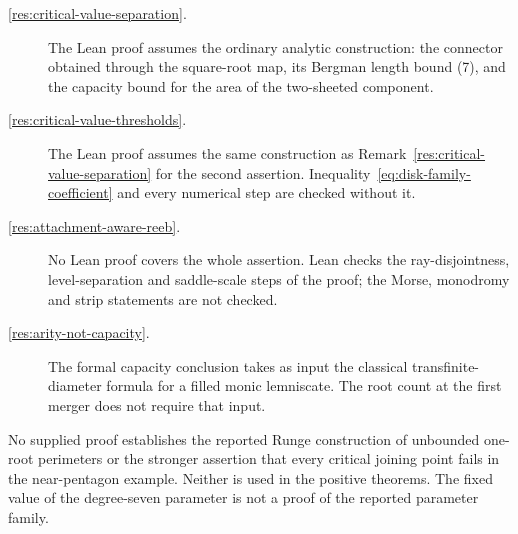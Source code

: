 \documentclass[11pt]{article}
\begin{document}
\begin{description}
\item[\ref{res:critical-value-separation}.] The Lean proof assumes the ordinary analytic construction: the connector obtained through the square-root map, its
Bergman length bound (7), and the capacity bound for the area of the
two-sheeted component.

\item[\ref{res:critical-value-thresholds}.] The Lean proof assumes the same construction as
Remark~\ref{res:critical-value-separation} for the second assertion.
Inequality~\eqref{eq:disk-family-coefficient} and every numerical step are
checked without it.

\item[\ref{res:attachment-aware-reeb}.] No Lean proof covers the whole assertion. Lean checks the
ray-disjointness, level-separation and saddle-scale steps of the proof; the
Morse, monodromy and strip statements are not checked.

\item[\ref{res:arity-not-capacity}.] The formal capacity conclusion takes
as input the classical transfinite-diameter formula for a filled monic
lemniscate. The root count at the first merger does not require that input.
\end{description}

No supplied proof establishes the reported Runge construction of
unbounded one-root perimeters or the stronger assertion that every
critical joining point fails in the near-pentagon example. Neither is
used in the positive theorems. The fixed value of the degree-seven
parameter is not a proof of the reported parameter family.
\evidenceparagraph{\evidencerecordurl}
\end{document}
